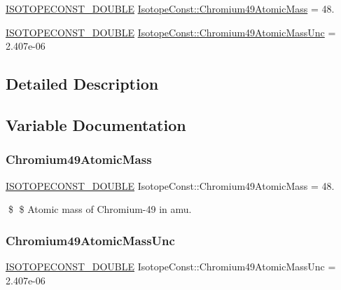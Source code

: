 \begin{DoxyCompactItemize}
\item 
\mbox{\hyperlink{group___isotope_const-_macros_ga8f45a7272ce02c0b4c65c44636ed719a}{I\+S\+O\+T\+O\+P\+E\+C\+O\+N\+S\+T\+\_\+\+D\+O\+U\+B\+LE}} \mbox{\hyperlink{group___isotope_const-_chromium-_cr49_ga8b5ac0de5eb9e8fa1773340ba938d983}{Isotope\+Const\+::\+Chromium49\+Atomic\+Mass}} = 48.
\item 
\mbox{\hyperlink{group___isotope_const-_macros_ga8f45a7272ce02c0b4c65c44636ed719a}{I\+S\+O\+T\+O\+P\+E\+C\+O\+N\+S\+T\+\_\+\+D\+O\+U\+B\+LE}} \mbox{\hyperlink{group___isotope_const-_chromium-_cr49_gaae8ad9e1cedc0caf07b8cb1fad6bc0cf}{Isotope\+Const\+::\+Chromium49\+Atomic\+Mass\+Unc}} = 2.\+407e-\/06
\end{DoxyCompactItemize}


\subsection{Detailed Description}


\subsection{Variable Documentation}
\mbox{\label{group___isotope_const-_chromium-_cr49_ga8b5ac0de5eb9e8fa1773340ba938d983}} 
\subsubsection{\texorpdfstring{Chromium49\+Atomic\+Mass}{Chromium49AtomicMass}}
{\footnotesize\ttfamily \mbox{\hyperlink{group___isotope_const-_macros_ga8f45a7272ce02c0b4c65c44636ed719a}{I\+S\+O\+T\+O\+P\+E\+C\+O\+N\+S\+T\+\_\+\+D\+O\+U\+B\+LE}} Isotope\+Const\+::\+Chromium49\+Atomic\+Mass = 48.}

\$ \$ Atomic mass of Chromium-\/49 in amu. \mbox{\label{group___isotope_const-_chromium-_cr49_gaae8ad9e1cedc0caf07b8cb1fad6bc0cf}} 
\subsubsection{\texorpdfstring{Chromium49\+Atomic\+Mass\+Unc}{Chromium49AtomicMassUnc}}
{\footnotesize\ttfamily \mbox{\hyperlink{group___isotope_const-_macros_ga8f45a7272ce02c0b4c65c44636ed719a}{I\+S\+O\+T\+O\+P\+E\+C\+O\+N\+S\+T\+\_\+\+D\+O\+U\+B\+LE}} Isotope\+Const\+::\+Chromium49\+Atomic\+Mass\+Unc = 2.\+407e-\/06}

